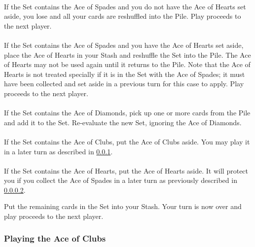 \documentclass{article}
\begin{document}
\paragraph{}
If the Set contains the Ace of Spades and you do not have the Ace of
Hearts set aside, you lose and all your cards are reshuffled into the
Pile. Play proceeds to the next player.

\paragraph{}
\label{par:spadeshearts}
If the Set contains the Ace of Spades and you have the Ace of Hearts set
aside, place the Ace of Hearts in your Stash and reshuffle the Set into
the Pile. The Ace of Hearts may not be used again until it returns to
the Pile. Note that the Ace of Hearts is not treated specially if it is
in the Set with the Ace of Spades; it must have been collected and set
aside in a previous turn for this case to apply. Play proceeds to the
next player.

\paragraph{}
If the Set contains the Ace of Diamonds, pick up one or more cards from
the Pile and add it to the Set. Re-evaluate the new Set, ignoring the
Ace of Diamonds.

\paragraph{}
If the Set contains the Ace of Clubs, put the Ace of Clubs aside. You
may play it in a later turn as described in \ref{sec:playac}.

\paragraph{}
If the Set contains the Ace of Hearts, put the Ace of Hearts aside. It
will protect you if you collect the Ace of Spades in a later turn as
previously described in \ref{par:spadeshearts}.

Put the remaining cards in the Set into your Stash. Your turn is now
over and play proceeds to the next player.

\subsubsection{Playing the Ace of Clubs}
\label{sec:playac}
\end{document}
